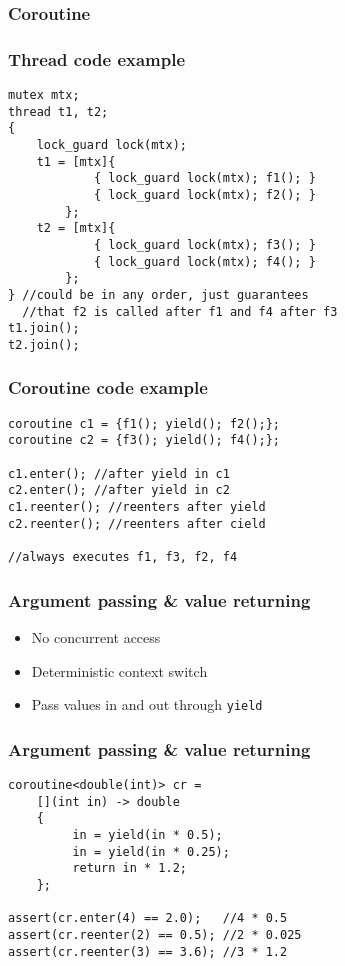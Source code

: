 \documentclass{beamer}
\begin{document}
\begin{frame}
\frametitle{Coroutine}
\begin{adjustbox}{max totalsize={.9\textwidth}{.7\textheight},center}

\end{adjustbox}
\end{frame}

\begin{frame}[fragile]
\frametitle{Thread code example}

\begin{lstlisting}
mutex mtx; 
thread t1, t2;
{
    lock_guard lock(mtx);    
    t1 = [mtx]{
            { lock_guard lock(mtx); f1(); }
            { lock_guard lock(mtx); f2(); }
        };
    t2 = [mtx]{
            { lock_guard lock(mtx); f3(); }
            { lock_guard lock(mtx); f4(); }
        };   
} //could be in any order, just guarantees
  //that f2 is called after f1 and f4 after f3
t1.join(); 
t2.join();
\end{lstlisting}
\end{frame}

\begin{frame}[fragile]
\frametitle{Coroutine code example}

\begin{lstlisting}
coroutine c1 = {f1(); yield(); f2();};
coroutine c2 = {f3(); yield(); f4();};    

c1.enter(); //after yield in c1
c2.enter(); //after yield in c2
c1.reenter(); //reenters after yield
c2.reenter(); //reenters after cield

//always executes f1, f3, f2, f4

\end{lstlisting}
\end{frame}

\begin{frame}
\frametitle{Argument passing \& value returning}

\begin{itemize}
\item<1-> No concurrent access
\item<2-> Deterministic context switch
\item<3-> Pass values in and out through \lstinline{yield}
\end{itemize}
\end{frame}

\begin{frame}[fragile]
\frametitle{Argument passing \& value returning}
\begin{lstlisting}
coroutine<double(int)> cr = 
    [](int in) -> double
    {
         in = yield(in * 0.5);
         in = yield(in * 0.25);
         return in * 1.2;
    };

assert(cr.enter(4) == 2.0);   //4 * 0.5
assert(cr.reenter(2) == 0.5); //2 * 0.025
assert(cr.reenter(3) == 3.6); //3 * 1.2
    
\end{lstlisting}

\end{frame}
\end{document}
